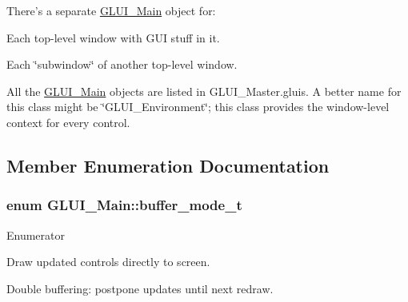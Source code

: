 There's a separate \hyperlink{classGLUI__Main}{G\-L\-U\-I\-\_\-\-Main} object for\-:
\begin{DoxyItemize}
\item Each top-\/level window with G\-U\-I stuff in it.
\end{DoxyItemize}

Each \char`\"{}subwindow\char`\"{} of another top-\/level window.

All the \hyperlink{classGLUI__Main}{G\-L\-U\-I\-\_\-\-Main} objects are listed in G\-L\-U\-I\-\_\-\-Master.\-gluis. A better name for this class might be \char`\"{}\-G\-L\-U\-I\-\_\-\-Environment\char`\"{}; this class provides the window-\/level context for every control. 

\subsection{Member Enumeration Documentation}
\hypertarget{classGLUI__Main_a0024f5e2750f6fe9e428ff885cf6d62e}{
\subsubsection[{buffer\-\_\-mode\-\_\-t}]{\setlength{\rightskip}{0pt plus 5cm}enum {\bf G\-L\-U\-I\-\_\-\-Main\-::buffer\-\_\-mode\-\_\-t}\hspace{0.3cm}{\ttfamily [protected]}}}\label{classGLUI__Main_a0024f5e2750f6fe9e428ff885cf6d62e}
\begin{Desc}
\item[Enumerator]\par
\begin{description}
\item[{\em 
\hypertarget{classGLUI__Main_a0024f5e2750f6fe9e428ff885cf6d62ea96e503bd03e3d418f350f3a854d0292d}{buffer\-\_\-front}\label{classGLUI__Main_a0024f5e2750f6fe9e428ff885cf6d62ea96e503bd03e3d418f350f3a854d0292d}
}]Draw updated controls directly to screen. \item[{\em 
\hypertarget{classGLUI__Main_a0024f5e2750f6fe9e428ff885cf6d62ea839b43cd2decf85c6bdcf738d92e122c}{buffer\-\_\-back}\label{classGLUI__Main_a0024f5e2750f6fe9e428ff885cf6d62ea839b43cd2decf85c6bdcf738d92e122c}
}]Double buffering\-: postpone updates until next redraw. \end{description}
\end{Desc}


